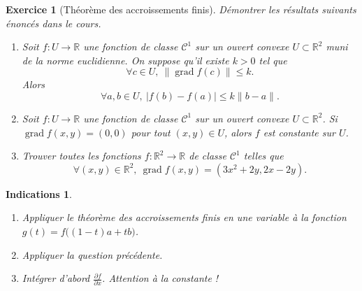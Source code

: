 \documentclass[11pt,a4paper]{article}
\newcommand{\Rr}{\mathbb{R}} \newcommand{\R}{\mathbb{R}}
\renewcommand{\le}{\leqslant} \renewcommand{\leq}{\leqslant}
\theoremstyle{exostyle}
\newtheorem{exo}{Exercice}
\newtheorem{ind}{Indications}
\newcommand{\enonce}{\begin{exo}} \newcommand{\finenonce}{\end{exo}}
\newcommand{\indication}{\begin{ind}} \newcommand{\finindication}{\end{ind}}
\newcommand{\grad}{\mathop{\mathrm{grad}}\nolimits}
\begin{document}
\enonce[Théorème des accroissements finis]
Démontrer les résultats suivants énoncés dans le cours.
\begin{enumerate}
	\item Soit $f: U \to \Rr$ une fonction de classe $\mathcal{C}^1$ sur un ouvert convexe $U \subset \Rr^2$
	muni de la norme euclidienne.
	On suppose qu'il existe $k > 0$ tel que
	\begin{equation*}
		\forall c \in U,\ \|\grad f (c)\| \leq k.
	\end{equation*}
	Alors
	\begin{equation*}
		\forall a, b \in U,\ \left| f(b)-f(a)  \right| \le k \| b -a \|.
	\end{equation*}
	\item Soit $f: U \to \Rr$ une fonction de classe $\mathcal{C}^1$ sur un ouvert convexe $U \subset \Rr^2$.
	Si $\grad f (x, y) = (0,0)$ pour tout $(x, y) \in U$, alors $f$ est constante sur $U$.
	\item Trouver toutes les fonctions $f : \Rr^2 \to \Rr$ de classe $\mathcal{C}^1$ telles que
	\begin{equation*}
		\forall (x, y) \in \Rr^2,\ \grad f (x, y) = (3x^2 + 2y, 2x - 2y).
	\end{equation*} 	 	
\end{enumerate}
\finenonce

\indication
\begin{enumerate}
	\item Appliquer le théorème des accroissements finis en une variable à la fonction $g(t) = f\big( (1-t)a + tb \big)$.
	
	\item Appliquer la question précédente.
	
	\item Intégrer d'abord $\frac{\partial f}{\partial x}$. Attention à la \og{}constante\fg{} !
\end{enumerate}
\finindication
\end{document}
